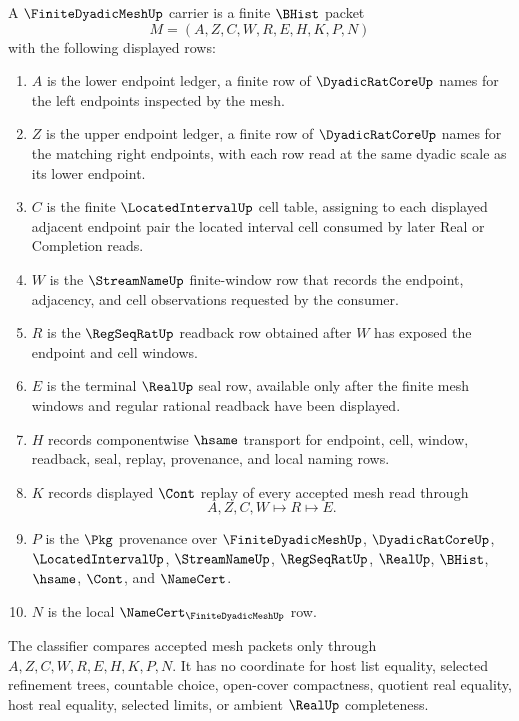 \begin{definition}
\label{def:finite-dyadic-mesh-carrier}
A $\FiniteDyadicMeshUp$ carrier is a finite $\BHist$ packet
$$
M=(A,Z,C,W,R,E,H,K,P,N)
$$
with the following displayed rows:
\begin{enumerate}
\item $A$ is the lower endpoint ledger, a finite row of $\DyadicRatCoreUp$ names for the left endpoints inspected by the mesh.
\item $Z$ is the upper endpoint ledger, a finite row of $\DyadicRatCoreUp$ names for the matching right endpoints, with each row read at the same dyadic scale as its lower endpoint.
\item $C$ is the finite $\LocatedIntervalUp$ cell table, assigning to each displayed adjacent endpoint pair the located interval cell consumed by later Real or Completion reads.
\item $W$ is the $\StreamNameUp$ finite-window row that records the endpoint, adjacency, and cell observations requested by the consumer.
\item $R$ is the $\RegSeqRatUp$ readback row obtained after $W$ has exposed the endpoint and cell windows.
\item $E$ is the terminal $\RealUp$ seal row, available only after the finite mesh windows and regular rational readback have been displayed.
\item $H$ records componentwise $\hsame$ transport for endpoint, cell, window, readback, seal, replay, provenance, and local naming rows.
\item $K$ records displayed $\Cont$ replay of every accepted mesh read through
$$
A,Z,C,W \longmapsto R \longmapsto E .
$$
\item $P$ is the $\Pkg$ provenance over $\FiniteDyadicMeshUp$, $\DyadicRatCoreUp$, $\LocatedIntervalUp$, $\StreamNameUp$, $\RegSeqRatUp$, $\RealUp$, $\BHist$, $\hsame$, $\Cont$, and $\NameCert$.
\item $N$ is the local $\NameCert_{\FiniteDyadicMeshUp}$ row.
\end{enumerate}
The classifier compares accepted mesh packets only through $A,Z,C,W,R,E,H,K,P,N$. It has no coordinate for host list equality, selected refinement trees, countable choice, open-cover compactness, quotient real equality, host real equality, selected limits, or ambient $\RealUp$ completeness.
\end{definition}


